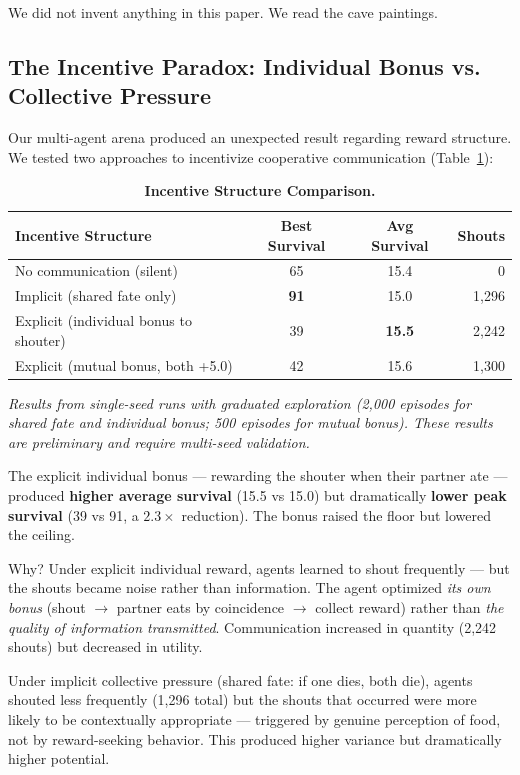 \documentclass{article}
\begin{document}
We did not invent anything in this paper. We read the cave paintings.

\subsection{The Incentive Paradox: Individual Bonus vs. Collective Pressure}
\label{sec:incentive_paradox}
Our multi-agent arena produced an unexpected result regarding reward structure. We tested two approaches to incentivize cooperative communication (Table~\ref{tab:incentive_results}):

\begin{table}[h]
\centering
\caption{\textbf{Incentive Structure Comparison.}}
\label{tab:incentive_results}
\begin{tabular}{lccr}
\toprule
\textbf{Incentive Structure} & \textbf{Best Survival} & \textbf{Avg Survival} & \textbf{Shouts} \\
\midrule
No communication (silent) & 65 & 15.4 & 0 \\
Implicit (shared fate only) & \textbf{91} & 15.0 & 1,296 \\
Explicit (individual bonus to shouter) & 39 & \textbf{15.5} & 2,242 \\
Explicit (mutual bonus, both +5.0) & 42 & 15.6 & 1,300 \\
\bottomrule
\end{tabular}
\end{table}
\textit{Results from single-seed runs with graduated exploration (2,000 episodes for shared fate and individual bonus; 500 episodes for mutual bonus). These results are preliminary and require multi-seed validation.}

The explicit individual bonus --- rewarding the shouter when their partner ate --- produced \textbf{higher average survival} (15.5 vs 15.0) but dramatically \textbf{lower peak survival} (39 vs 91, a $2.3\times$ reduction). The bonus raised the floor but lowered the ceiling.

Why? Under explicit individual reward, agents learned to shout frequently --- but the shouts became noise rather than information. The agent optimized \textit{its own bonus} (shout $\rightarrow$ partner eats by coincidence $\rightarrow$ collect reward) rather than \textit{the quality of information transmitted}. Communication increased in quantity (2,242 shouts) but decreased in utility.

Under implicit collective pressure (shared fate: if one dies, both die), agents shouted less frequently (1,296 total) but the shouts that occurred were more likely to be contextually appropriate --- triggered by genuine perception of food, not by reward-seeking behavior. This produced higher variance but dramatically higher potential.
\end{document}
